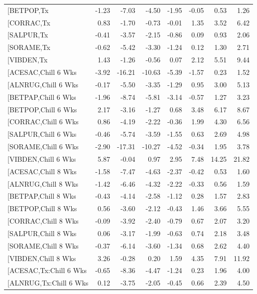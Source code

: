 \documentclass{article}\usepackage[]{graphicx}\usepackage[]{color}
\begin{document}
\begin{longtable}{lrrrrrrr}
  [BETPOP,Tx & -1.23 & -7.03 & -4.50 & -1.95 & -0.05 & 0.53 & 1.26 \\ 
  [CORRAC,Tx & 0.83 & -1.70 & -0.73 & -0.01 & 1.35 & 3.52 & 6.42 \\ 
  [SALPUR,Tx & -0.41 & -3.57 & -2.15 & -0.86 & 0.09 & 0.93 & 2.06 \\ 
  [SORAME,Tx & -0.62 & -5.42 & -3.30 & -1.24 & 0.12 & 1.30 & 2.71 \\ 
  [VIBDEN,Tx & 1.43 & -1.26 & -0.56 & 0.07 & 2.12 & 5.51 & 9.44 \\ 
  [ACESAC,Chill 6 Wks & -3.92 & -16.21 & -10.63 & -5.39 & -1.57 & 0.23 & 1.52 \\ 
  [ALNRUG,Chill 6 Wks & -0.17 & -5.50 & -3.35 & -1.29 & 0.95 & 3.00 & 5.13 \\ 
  [BETPAP,Chill 6 Wks & -1.96 & -8.74 & -5.81 & -3.14 & -0.57 & 1.27 & 3.23 \\ 
  [BETPOP,Chill 6 Wks & 2.17 & -3.16 & -1.27 & 0.68 & 3.48 & 6.17 & 8.67 \\ 
  [CORRAC,Chill 6 Wks & 0.86 & -4.19 & -2.22 & -0.36 & 1.99 & 4.30 & 6.56 \\ 
  [SALPUR,Chill 6 Wks & -0.46 & -5.74 & -3.59 & -1.55 & 0.63 & 2.69 & 4.98 \\ 
  [SORAME,Chill 6 Wks & -2.90 & -17.31 & -10.27 & -4.52 & -0.34 & 1.95 & 3.78 \\ 
  [VIBDEN,Chill 6 Wks & 5.87 & -0.04 & 0.97 & 2.95 & 7.48 & 14.25 & 21.82 \\ 
  [ACESAC,Chill 8 Wks & -1.58 & -7.47 & -4.63 & -2.37 & -0.42 & 0.53 & 1.60 \\ 
  [ALNRUG,Chill 8 Wks & -1.42 & -6.46 & -4.32 & -2.22 & -0.33 & 0.56 & 1.59 \\ 
  [BETPAP,Chill 8 Wks & -0.43 & -4.14 & -2.58 & -1.12 & 0.28 & 1.57 & 2.83 \\ 
  [BETPOP,Chill 8 Wks & 0.56 & -3.60 & -2.12 & -0.43 & 1.46 & 3.66 & 5.55 \\ 
  [CORRAC,Chill 8 Wks & -0.09 & -3.92 & -2.40 & -0.79 & 0.67 & 2.07 & 3.20 \\ 
  [SALPUR,Chill 8 Wks & 0.06 & -3.17 & -1.99 & -0.63 & 0.74 & 2.18 & 3.48 \\ 
  [SORAME,Chill 8 Wks & -0.37 & -6.14 & -3.60 & -1.34 & 0.68 & 2.62 & 4.40 \\ 
  [VIBDEN,Chill 8 Wks & 3.26 & -0.28 & 0.20 & 1.59 & 4.35 & 7.91 & 11.92 \\ 
  [ACESAC,Tx:Chill 6 Wks & -0.65 & -8.36 & -4.47 & -1.24 & 0.23 & 1.96 & 4.00 \\ 
  [ALNRUG,Tx:Chill 6 Wks & 0.12 & -3.75 & -2.05 & -0.45 & 0.66 & 2.39 & 4.50 \\ 

\end{longtable}
\end{document}
